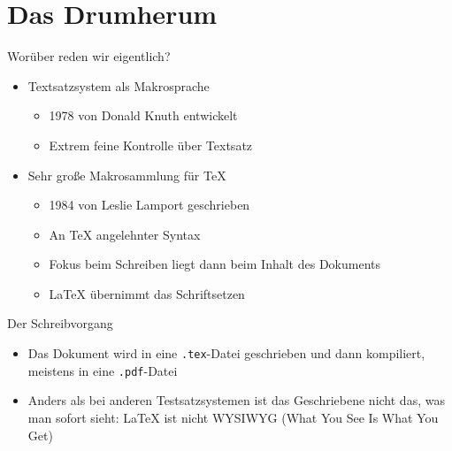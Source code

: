 \documentclass[compress, 10pt, aspectratio=169]{beamer}
\begin{document}
\begin{frame}[plain]
  \titlepage
\end{frame}

{
}

\begin{frame}[plain]
  \tableofcontents
\end{frame}

\section{Das Drumherum}
\begin{frame}[plain]{Worüber reden wir eigentlich?}
  \begin{itemize}
    \item[\bfseries\TeX:]
      Textsatzsystem als Makrosprache
      \begin{itemize}
        \item
          1978 von Donald Knuth entwickelt
        \item
          Extrem feine Kontrolle über Textsatz
      \end{itemize}
    \item[\bfseries\LaTeX:]
      Sehr große Makrosammlung für \TeX{}
      \begin{itemize}
        \item
          1984 von Leslie Lamport geschrieben
        \item
          An \TeX{} angelehnter Syntax
        \item
          Fokus beim Schreiben liegt dann beim Inhalt des Dokuments
        \item
          \LaTeX{} übernimmt das Schriftsetzen
      \end{itemize}
  \end{itemize}
\end{frame}

\begin{frame}{Der Schreibvorgang}
	\begin{itemize}
	  \item
      Das Dokument wird in eine \texttt{.tex}-Datei geschrieben und dann
      kompiliert, meistens in eine \texttt{.pdf}-Datei
    \item
      Anders als bei anderen Testsatzsystemen ist das Geschriebene nicht das,
      was man sofort sieht: \LaTeX{} ist nicht WYSIWYG (What You See Is What
      You Get)
	\end{itemize}
\end{frame}
\end{document}
